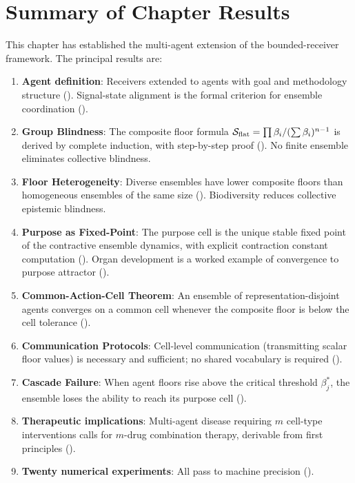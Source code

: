 \section{Summary of Chapter Results}
\label{sec:ch02b-summary}

This chapter has established the multi-agent extension of the bounded-receiver
framework.  The principal results are:

\begin{enumerate}[leftmargin=2em]
  \item \textbf{Agent definition}: Receivers extended to agents with goal and
    methodology structure ().  Signal-state alignment is the
    formal criterion for ensemble coordination ().

  \item \textbf{Group Blindness}: The composite floor formula
    $\mathcal{S}_{\mathrm{flat}} = \prod \beta_i / (\sum \beta_i)^{n-1}$ is derived by
    complete induction, with step-by-step proof ().
    No finite ensemble eliminates collective blindness.

  \item \textbf{Floor Heterogeneity}: Diverse ensembles have lower composite
    floors than homogeneous ensembles of the same size ().
    Biodiversity reduces collective epistemic blindness.

  \item \textbf{Purpose as Fixed-Point}: The purpose cell is the unique stable
    fixed point of the contractive ensemble dynamics, with explicit contraction
    constant computation ().
    Organ development is a worked example of convergence to purpose attractor
    ().

  \item \textbf{Common-Action-Cell Theorem}: An ensemble of representation-disjoint
    agents converges on a common cell whenever the composite floor is below the
    cell tolerance ().

  \item \textbf{Communication Protocols}: Cell-level communication (transmitting
    scalar floor values) is necessary and sufficient; no shared vocabulary is
    required ().

  \item \textbf{Cascade Failure}: When agent floors rise above the critical
    threshold $\beta_j^*$, the ensemble loses the ability to reach its purpose
    cell ().

  \item \textbf{Therapeutic implications}: Multi-agent disease requiring $m$
    cell-type interventions calls for $m$-drug combination therapy, derivable
    from first principles ().

  \item \textbf{Twenty numerical experiments}: All pass to machine precision
    ().
\end{enumerate}

